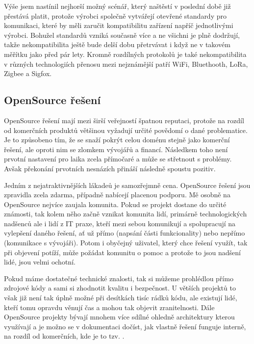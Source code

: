 \documentclass[thesis=B,czech]{FITthesis}[2019/12/23]
\begin{document}
Výše jsem nastínil nejhorší možný scénář, který naštěstí v poslední době již přestává platit, protože výrobci společně vytvářejí otevřené standardy pro komunikaci, které by měli zaručit kompatibilitu zařízení napříč jednotlivými výrobci. Bohužel standardů vzniká současně více a ne všichni je plně dodržují, takže nekompatibilita ještě bude delší dobu přetrvávat i když ne v takovém měřítku jako před pár lety. Kromně rozdílných protokolů je také nekompatibilita v různých technologiích přenosu mezi nejznámější patří WiFi, Bluethooth, LoRa, Zigbee a Sigfox.

\subsection{OpenSource řešení}
OpenSource řešení mají mezi širší veřejností špatnou reputaci, protože na rozdíl od komerčních  produktů většinou vyžadují určité povědomí o dané problematice. Je to způsobeno tím, že se snaží pokrýt celou doménu stejně jako komerční řešení, ale oproti nim se zlomkem vývojářů a financí. Následkem toho není prvotní nastavení pro laika zcela přímočaré a může se střetnout s problémy. Avšak překonání prvotních nesnázích přináší následně spoustu pozitiv.

Jedním z nejatraktivnějších lákadeů je samozřejmně cena. OpenSource řešení jsou zpravidla zcela zdarma, případně nabícejí placenou podporu. Mě osobně na OpenSource nejvíce zaujala komunita. Pokud se projekt dostane do určité známosti, tak kolem něho začně vznikat komunita lidí, primárně technologických nadšenců ale i lidí z IT praxe, kteří mezi sebou komunikují a spolupracují na vylepšení daného řešení, ať už přímo (napsání části funkcionality) nebo nepřímo (komunikace s vývojáři). Potom i obyčejný uživatel, který chce řešení využít, tak při objevení potíží, může požádat komunitu o pomoc a protože to jsou nadšení lidé, jsou velmi ochotní.

Pokud máme dostatečné technické znalosti, tak si můžeme prohlédlou přímo zdrojové kódy a sami si zhodnotit kvalitu i bezpečnost. U větších projektů to však již není tak úplně možné při desítkách tisíc rádků kódu, ale existují lidé, kteří tomu opravdu věnují čas a mohou tak objevit zranitelnosti. Dále OpenSource projekty bývají mnohem více sdílné ohledně architektury kterou využívají a je možno se v dokumentaci dočíst, jak vlastně řešení funguje interně, na rozdíl od komerčních, kde je to tzv. .
\end{document}
